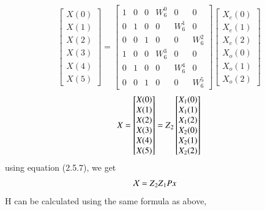 \documentclass[journal,12pt,twocolumn]{IEEEtran}
\renewcommand\thesection{\arabic{section}}
\begin{document}
\begin{enumerate}[label=\thesection.\arabic*.,ref=\thesection.\theenumi]

\begin{equation}
\begin{bmatrix}
X(0) \\ 
X(1) \\ 
X(2) \\ 
X(3) \\ 
X(4) \\ 
X(5) 
\end{bmatrix}
=
\begin{bmatrix}
1 & 0 & 0 & W^{0}_{6} & 0 & 0\\
0 & 1 & 0 &  0 & W^{1}_{6} & 0\\
0 & 0 & 1 & 0 & 0 & W^{2}_{6}\\
1 & 0 & 0 & W^{3}_{6} & 0 & 0\\
0 & 1 & 0 & 0 & W^{4}_{6} & 0\\
0 & 0 & 1 & 0 & 0 & W^{5}_{6}
\end{bmatrix}
\begin{bmatrix}
X_{e}(0) \\ 
X_{e}(1) \\ 
X_{e}(2) \\ 
X_{o}(0) \\ 
X_{o}(1) \\ 
X_{o}(2)
\end{bmatrix}
\end{equation}
\begin{equation}
X = 
\begin{bmatrix}
X(0) \\ 
X(1) \\ 
X(2) \\ 
X(3) \\ 
X(4) \\ 
X(5) 
\end{bmatrix}
= Z\textsubscript{2}
\begin{bmatrix}
X_{1}(0) \\ 
X_{1}(1) \\ 
X_{1}(2) \\ 
X_{2}(0) \\ 
X_{2}(1) \\ 
X_{2}(2)
\end{bmatrix}
\end{equation}
using equation (2.5.7), we get
\begin{align}
    \mathcal 
    X &= Z\textsubscript{2}Z\textsubscript{1}Px
\end{align}
H can be calculated using the same formula as above,

\end{enumerate}
\end{document}
